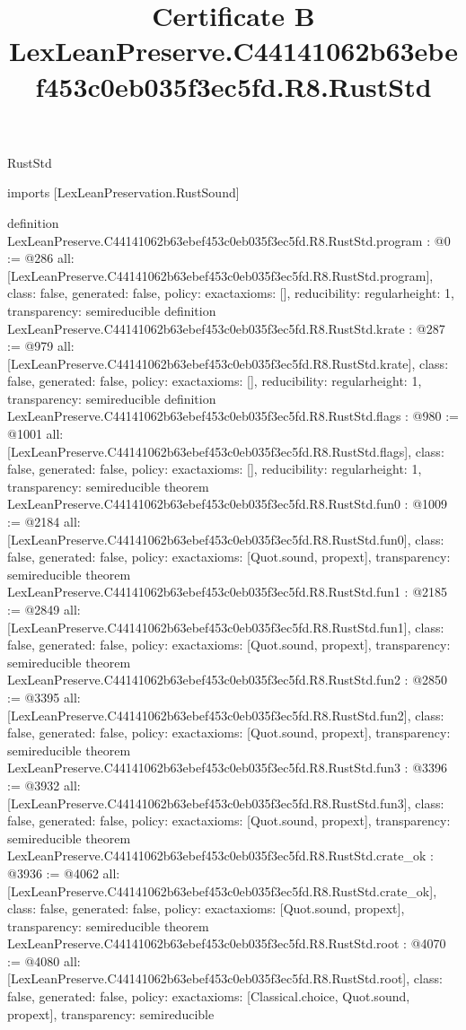 \begin{lexlean}{RustStd}
\title{Certificate B LexLeanPreserve.C44141062b63ebef453c0eb035f3ec5fd.R8.RustStd}
\begin{coremodule}
imports [LexLeanPreservation.RustSound]

definition LexLeanPreserve.C44141062b63ebef453c0eb035f3ec5fd.R8.RustStd.program : @0 := @286 {
  all: [LexLeanPreserve.C44141062b63ebef453c0eb035f3ec5fd.R8.RustStd.program],
  class: false,
  generated: false,
  policy: exact{axioms: []},
  reducibility: regular{height: 1},
  transparency: semireducible
}
definition LexLeanPreserve.C44141062b63ebef453c0eb035f3ec5fd.R8.RustStd.krate : @287 := @979 {
  all: [LexLeanPreserve.C44141062b63ebef453c0eb035f3ec5fd.R8.RustStd.krate],
  class: false,
  generated: false,
  policy: exact{axioms: []},
  reducibility: regular{height: 1},
  transparency: semireducible
}
definition LexLeanPreserve.C44141062b63ebef453c0eb035f3ec5fd.R8.RustStd.flags : @980 := @1001 {
  all: [LexLeanPreserve.C44141062b63ebef453c0eb035f3ec5fd.R8.RustStd.flags],
  class: false,
  generated: false,
  policy: exact{axioms: []},
  reducibility: regular{height: 1},
  transparency: semireducible
}
theorem LexLeanPreserve.C44141062b63ebef453c0eb035f3ec5fd.R8.RustStd.fun0 : @1009 := @2184 {
  all: [LexLeanPreserve.C44141062b63ebef453c0eb035f3ec5fd.R8.RustStd.fun0],
  class: false,
  generated: false,
  policy: exact{axioms: [Quot.sound, propext]},
  transparency: semireducible
}
theorem LexLeanPreserve.C44141062b63ebef453c0eb035f3ec5fd.R8.RustStd.fun1 : @2185 := @2849 {
  all: [LexLeanPreserve.C44141062b63ebef453c0eb035f3ec5fd.R8.RustStd.fun1],
  class: false,
  generated: false,
  policy: exact{axioms: [Quot.sound, propext]},
  transparency: semireducible
}
theorem LexLeanPreserve.C44141062b63ebef453c0eb035f3ec5fd.R8.RustStd.fun2 : @2850 := @3395 {
  all: [LexLeanPreserve.C44141062b63ebef453c0eb035f3ec5fd.R8.RustStd.fun2],
  class: false,
  generated: false,
  policy: exact{axioms: [Quot.sound, propext]},
  transparency: semireducible
}
theorem LexLeanPreserve.C44141062b63ebef453c0eb035f3ec5fd.R8.RustStd.fun3 : @3396 := @3932 {
  all: [LexLeanPreserve.C44141062b63ebef453c0eb035f3ec5fd.R8.RustStd.fun3],
  class: false,
  generated: false,
  policy: exact{axioms: [Quot.sound, propext]},
  transparency: semireducible
}
theorem LexLeanPreserve.C44141062b63ebef453c0eb035f3ec5fd.R8.RustStd.crate_ok : @3936 := @4062 {
  all: [LexLeanPreserve.C44141062b63ebef453c0eb035f3ec5fd.R8.RustStd.crate_ok],
  class: false,
  generated: false,
  policy: exact{axioms: [Quot.sound, propext]},
  transparency: semireducible
}
theorem LexLeanPreserve.C44141062b63ebef453c0eb035f3ec5fd.R8.RustStd.root : @4070 := @4080 {
  all: [LexLeanPreserve.C44141062b63ebef453c0eb035f3ec5fd.R8.RustStd.root],
  class: false,
  generated: false,
  policy: exact{axioms: [Classical.choice, Quot.sound, propext]},
  transparency: semireducible
}


\end{coremodule}
\end{lexlean}
